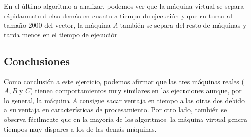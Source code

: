 \documentclass[a4paper, 11pt]{article}
\begin{document}
\begin{enumerate}
  En el último algoritmo a analizar, podemos ver que la máquina virtual se separa rápidamente d elas demás en cuanto a tiempo de ejecución y que en torno al tamaño $2000$ del vector, la máquina $A$ también se separa del resto de máquinas y tarda menos en el tiempo de ejecución
  \subsection{Conclusiones}
  Como conclusión a este ejercicio, podemos afirmar que las tres máquinas reales ($A,B$ y $C$) tienen comportamientos muy similares en las ejecuciones aunque, por lo general, la máquina $A$ consigue sacar ventaja en tiempo a las otras dos debido a su ventaja en características de procesamiento. Por otro lado, también se observa fácilmente que en la mayoría de los algoritmos, la máquina virtual genera tiempos muy dispares a los de las demás máquinas.
\end{enumerate}
\end{document}
